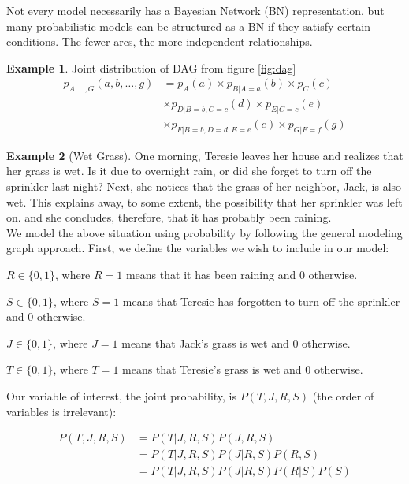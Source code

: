 \documentclass[12pt, a4paper]{article}
\theoremstyle{definition}
\newtheorem{example}{Example}[section]
\numberwithin{figure}{section}
\numberwithin{equation}{section}
\numberwithin{table}{section}
\begin{document}
Not every model necessarily has a Bayesian Network (BN) representation, but many probabilistic models can be structured as a BN if they satisfy certain conditions. The fewer arcs, the more independent relationships.

\begin{example}{Joint distribution of DAG from figure \ref{fig:dag}}
\label{ex:club-wrestling}
\begin{align}
p_{A, \dots, G}(a, b, \dots, g)
&= p_{A}(a) \times p_{B|A=a}(b) \times p_{C}(c) \\
& \times p_{D|B=b,C=c}(d) \times p_{E|C=c}(e) \\
& \times p_{F|B=b,D=d,E=e}(e) \times p_{G|F=f}(g)
\end{align}
\end{example}

\begin{example}[Wet Grass]
\label{ex:wet-grass}
One morning, Teresie leaves her house and realizes that her grass is wet. Is it due to overnight rain, or did she forget to turn off the sprinkler last night? Next, she notices that the grass of her neighbor, Jack, is also wet. This explains away, to some extent, the possibility that her sprinkler was left on. and she concludes, therefore, that it has probably been raining.  \\

We model the above situation using probability by following the general modeling graph approach. First, we define the variables we wish to include in our model:  

$R \in \{0,1\}$, where $R = 1$ means that it has been raining and $0$ otherwise.  

$S \in \{0,1\}$, where $S = 1$ means that Teresie has forgotten to turn off the sprinkler and $0$ otherwise.  

$J \in \{0,1\}$, where $J = 1$ means that Jack's grass is wet and $0$ otherwise.  

$T \in \{0,1\}$, where $T = 1$ means that Teresie's grass is wet and $0$ otherwise.  

Our variable of interest, the joint probability, is $P(T, J, R, S)$ (the order of variables is irrelevant):

\begin{align}
P(T, J, R, S)
&= P(T | J, R, S) P(J, R, S)\\
&= P(T | J, R, S) P(J | R, S) P(R, S) \\
&= P(T | J, R, S) P(J | R, S) P(R | S) P(S)
\end{align}


\end{example}
\end{document}
